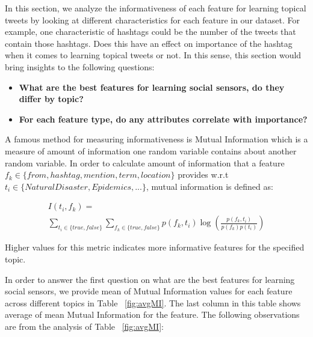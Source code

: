In this section, we analyze the informativeness of each feature for learning topical tweets by looking at different characteristics for each feature in our dataset. For example, one characteristic of hashtags could be the number of the tweets that contain those hashtags. Does this have an effect on importance of the hashtag when it comes to learning topical tweets or not. In this sense, this section would bring insights to the following questions:

\begin{itemize}
\item \textbf{What are the best features for learning social sensors, do they differ by topic?}
\item \textbf{For each feature type, do any attributes correlate with importance?}
\end{itemize}

A famous method for measuring informativeness is Mutual Information which is a measure of amount of information one random variable contains about another random variable. In order to calculate amount of information that a feature $f_k \in \{from, hashtag, mention, term, location\}$ provides w.r.t $t_i \in \{NaturalDisaster, Epidemics, ...\}$, mutual information is defined as:

\begin{multline}
I(t_i, f_k)= \\
 \sum_{t_i\in \{ true, false \}} \sum_{f_k\in \{ true, false\}}p(f_k,t_i)\log \left ( \frac{p(f_k,t_i)}{p(f_k)p(t_i)} \right )
 \label{eq:eq1}
\end{multline}

Higher values for this metric indicates more informative features for the specified topic.

In order to answer the first question on what are the best features for learning social sensors, we provide mean of Mutual Information values for each feature across different topics in Table ~\ref{fig:avgMI}. The last column in this table shows average of mean Mutual Information for the feature. The following observations are from the analysis of Table ~\ref{fig:avgMI}:

